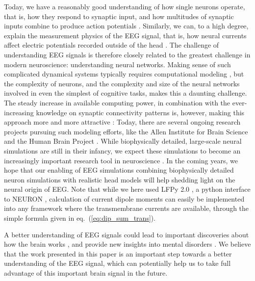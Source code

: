 \documentclass[preprint,10pt,authoryear]{elsarticle}
\begin{document}
Today, we have a reasonably good understanding of how single neurons operate, that is, how they respond to synaptic input, and how multitudes of synaptic inputs combine to produce action potentials \citep{EINEVOLL2019}.
Similarly, we can, to a high degree, explain the measurement physics of the EEG signal, that is, how neural currents affect electric potentials recorded outside of the head \citep{NUNEZ2006, COHEN2017}.
The challenge of understanding EEG signals is therefore closely related to the greatest challenge in modern neuroscience: understanding neural networks. 
Making sense of such complicated dynamical systems typically requires computational modeling \citep{EINEVOLL2019}, but the complexity of neurons, and the complexity and size of the neural networks involved in even the simplest of cognitive tasks, makes this a daunting challenge.
The steady increase in available computing power, in combination with the ever-increasing knowledge on synaptic connectivity patterns is, however, making this approach more and more attractive \citep{Reimann2013, Egger2014, MARKRAM2015, HAGEN2016, Gratiy2018, Arkhipov2018, Reimann2019, BILLEH2019}: Today, there are several ongoing research projects pursuing such modeling efforts, like the Allen Institute for Brain Science and the Human Brain Project \citep{EINEVOLL2019}.
While biophysically detailed, large-scale neural simulations are still in their infancy, we expect these simulations to become an increasingly important research tool in neuroscience \citep{EINEVOLL2019}.
In the coming years, we hope that our enabling of EEG simulations combining biophysically detailed neuron simulations with realistic head models will help shedding light on the neural origin of EEG.
Note that while we here used LFPy 2.0 \citep{HAGEN2018, HAGEN2019}, a python interface to NEURON \citep{CARNEVALE2006}, calculation of current dipole moments can easily be implemented into any framework where the transmembrane currents are available, through the simple formula given in eq.~(\ref{eq:dip_sum_trans}). 

A better understanding of EEG signals could lead to important discoveries about how the brain works \citep{SILVA2013, Uhlirova2016, Pesaran2018, Ilmoniemi2019}, and provide new insights into mental disorders \citep{MAKI2019, Sahin2019}.
We believe that the work presented in this paper is an important step towards a better understanding of the EEG signal, which can potentially help us to take full advantage of this important brain signal in the future.
\end{document}
